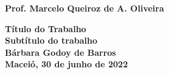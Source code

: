 \begin{titlepage}
\begin{center}
	\textbf{Prof. Marcelo Queiroz de A. Oliveira}\\
	\vspace{6cm}

	\textbf{\LARGE Título do Trabalho}\\
    \vspace{2mm}
	\textbf{\large Subtítulo do trabalho}\\
    
    \vspace{6cm}
	\textbf{Bárbara Godoy de Barros}\\
    
	\vfill
	\textbf{Maceió, 30 de junho de 2022}
\end{center}
\end{titlepage}